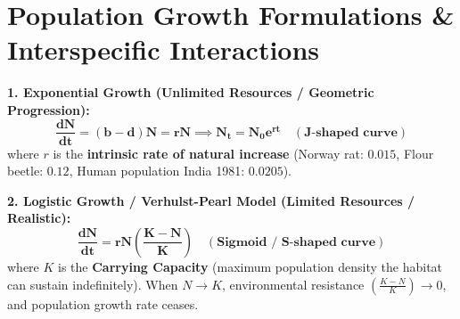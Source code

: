 \documentclass[10pt,twoside,openright]{book}
\begin{document}
\section{Population Growth Formulations \& Interspecific Interactions}

\begin{formulabox}
\textbf{1. Exponential Growth (Unlimited Resources / Geometric Progression):}
\begin{equation}
  \mathbf{\frac{dN}{dt} = (b - d)N = rN \implies N_t = N_0 e^{rt}} \quad (\textbf{J-shaped curve})
\end{equation}
where $r$ is the \textbf{intrinsic rate of natural increase} (Norway rat: $0.015$, Flour beetle: $0.12$, Human population India 1981: $0.0205$).

\textbf{2. Logistic Growth / Verhulst-Pearl Model (Limited Resources / Realistic):}
\begin{equation}
  \mathbf{\frac{dN}{dt} = rN \left(\frac{K - N}{K}\right)} \quad (\textbf{Sigmoid / S-shaped curve})
\end{equation}
where $K$ is the \textbf{Carrying Capacity} (maximum population density the habitat can sustain indefinitely). When $N \to K$, environmental resistance $\left(\frac{K-N}{K}\right) \to 0$, and population growth rate ceases.
\end{formulabox}
\end{document}
